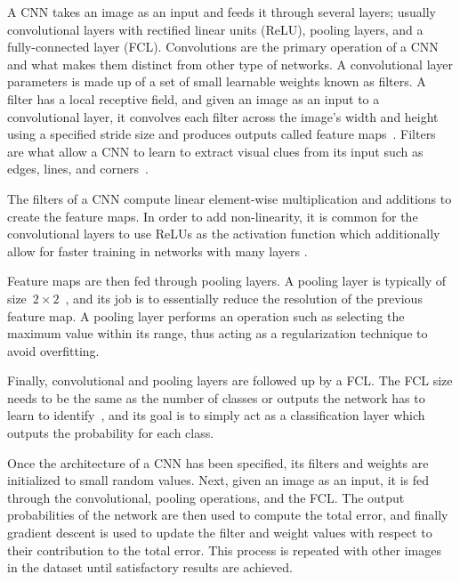 A CNN takes an image as an input and feeds it through several layers; usually convolutional layers with rectified linear units (ReLU), pooling layers, and a fully-connected layer (FCL). Convolutions are the primary operation of a CNN and what makes them distinct from other type of networks. A convolutional layer parameters is made up of a set of small learnable weights known as filters. A filter has a local receptive field, and given an image as an input to a convolutional layer, it convolves each filter across the image's width and height using a specified stride size and produces outputs called feature maps~\cite{cnn-star-galaxy}. Filters are what allow a CNN to learn to extract visual clues from its input such as edges, lines, and corners~\cite{Lecun99objectrecognition}.

The filters of a CNN compute linear element-wise multiplication and additions to create the feature maps. In order to add non-linearity, it is common for the convolutional layers to use ReLUs as the activation function which additionally allow for faster training in networks with many layers \cite{cnn-star-galaxy}.

Feature maps are then fed through pooling layers. A pooling layer is typically of size~$2 \times 2$~\cite{NIPS2012_4824}, and  its job is to essentially reduce the resolution of the previous feature map. A pooling layer performs an operation such as selecting the maximum value within its range, thus acting as a regularization technique to avoid overfitting.

Finally, convolutional and pooling layers are followed up by a FCL. The FCL size needs to be the same as the number of classes or outputs the network has to learn to identify~\cite{Ciresan11flexible}, and its goal is to simply act as a classification layer which outputs the probability for each class.

Once the architecture of a CNN has been specified, its filters and weights are initialized to small random values. Next, given an image as an input, it is fed through the convolutional, pooling operations, and the FCL. The output probabilities of the network are then used to compute the total error, and finally gradient descent is used to update the filter and weight values with respect to their contribution to the total error. This process is repeated with other images in the dataset until satisfactory results are achieved.

